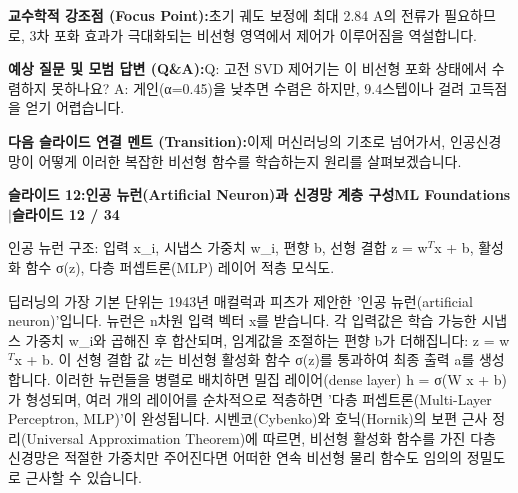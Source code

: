\documentclass[11pt,a4paper]{article}
\begin{document}
\vspace{0.2em}
\begin{tcolorbox}[colback=lightbg,colframe=bordergray,left=6pt,right=6pt,top=3pt,bottom=3pt,boxrule=0.6pt,arc=2.5pt]
\small
\noindent\textbf{\color{navy}교수학적 강조점 (Focus Point):}\enspace 초기 궤도 보정에 최대 2.84 A의 전류가 필요하므로, 3차 포화 효과가 극대화되는 비선형 영역에서 제어가 이루어짐을 역설합니다.\par\vspace{0.3em}
\noindent\textbf{\color{successgreen}예상 질문 및 모범 답변 (Q\&A):}\enspace Q: 고전 SVD 제어기는 이 비선형 포화 상태에서 수렴하지 못하나요? A: 게인(α=0.45)을 낮추면 수렴은 하지만, 9.4스텝이나 걸려 고득점을 얻기 어렵습니다.\par\vspace{0.3em}
\noindent\textbf{\color{accent}다음 슬라이드 연결 멘트 (Transition):}\enspace 이제 머신러닝의 기초로 넘어가서, 인공신경망이 어떻게 이러한 복잡한 비선형 함수를 학습하는지 원리를 살펴보겠습니다.
\end{tcolorbox}
\clearpage
\hypertarget{slide.12}{}
{}
\noindent\begin{tcolorbox}[colback=navy,colframe=navy,left=6pt,right=6pt,top=3pt,bottom=3pt,boxrule=0pt,arc=2pt]
{\large\bfseries\color{white}슬라이드 12:\enspace 인공 뉴런(Artificial Neuron)과 신경망 계층 구성}\hfill{\footnotesize\bfseries\color{white!85!lightbg}ML Foundations \enspace$|$\enspace 슬라이드 12 / 34}
\end{tcolorbox}
\vspace{0.2em}
\begin{tcolorbox}[colback=lightbg,colframe=bordergray,title={\footnotesize\bfseries\color{darkgray}슬라이드 시각 구성 요약},fontupper=\small,left=6pt,right=6pt,top=2.5pt,bottom=2.5pt,boxrule=0.6pt,arc=2.5pt]
인공 뉴런 구조: 입력 x\_i, 시냅스 가중치 w\_i, 편향 b, 선형 결합 z = w$^T$x + b, 활성화 함수 σ(z), 다층 퍼셉트론(MLP) 레이어 적층 모식도.
\end{tcolorbox}
\vspace{0.2em}
\begin{tcolorbox}[colback=white,colframe=primaryblue,title={\footnotesize\bfseries\color{white}발표자 구두 대본 (Spoken Script)},fontupper=\small,left=6pt,right=6pt,top=3pt,bottom=3pt,boxrule=0.8pt,arc=2.5pt]
딥러닝의 가장 기본 단위는 1943년 매컬럭과 피츠가 제안한 '인공 뉴런(artificial neuron)'입니다. 뉴런은 n차원 입력 벡터 x를 받습니다. 각 입력값은 학습 가능한 시냅스 가중치 w\_i와 곱해진 후 합산되며, 임계값을 조절하는 편향 b가 더해집니다: z = w$^T$x + b. 이 선형 결합 값 z는 비선형 활성화 함수 σ(z)를 통과하여 최종 출력 a를 생성합니다. 이러한 뉴런들을 병렬로 배치하면 밀집 레이어(dense layer) h = σ(W x + b)가 형성되며, 여러 개의 레이어를 순차적으로 적층하면 '다층 퍼셉트론(Multi-Layer Perceptron, MLP)'이 완성됩니다. 시벤코(Cybenko)와 호닉(Hornik)의 보편 근사 정리(Universal Approximation Theorem)에 따르면, 비선형 활성화 함수를 가진 다층 신경망은 적절한 가중치만 주어진다면 어떠한 연속 비선형 물리 함수도 임의의 정밀도로 근사할 수 있습니다.
\end{tcolorbox}
\end{document}
